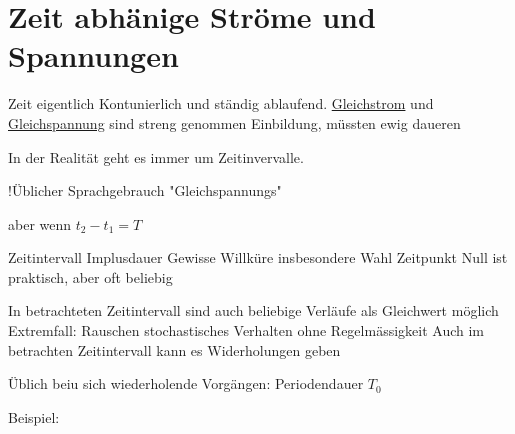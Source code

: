 \documentclass{article}
\begin{document}


\section{Zeit abhänige Ströme und Spannungen}

Zeit eigentlich Kontunierlich und ständig ablaufend.
\underline{Gleichstrom} und \underline{Gleichspannung} sind streng genommen Einbildung, müssten ewig daueren

In der Realität geht es immer um Zeitinvervalle. \newline

\newline
!Üblicher Sprachgebrauch "Gleichspannungs"

aber wenn $t_2 - t_1 = T$

Zeitintervall Implusdauer
Gewisse Willküre
insbesondere Wahl Zeitpunkt Null ist praktisch, aber oft beliebig


In betrachteten Zeitintervall sind auch beliebige Verläufe als Gleichwert möglich
Extremfall: Rauschen stochastisches Verhalten ohne Regelmässigkeit
Auch im betrachten Zeitintervall kann es Widerholungen geben

Üblich beiu sich wiederholende Vorgängen: Periodendauer $T_0$

Beispiel:
\newline

\end{document}
